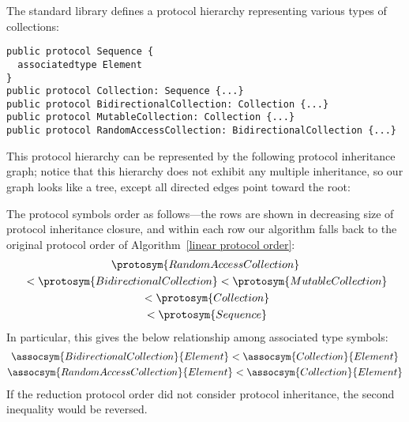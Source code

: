 \documentclass[../generics]{subfiles}
\begin{document}
\begin{example}
The standard library defines a protocol hierarchy representing various types of collections:
\begin{Verbatim}
public protocol Sequence {
  associatedtype Element
}
public protocol Collection: Sequence {...}
public protocol BidirectionalCollection: Collection {...}
public protocol MutableCollection: Collection {...}
public protocol RandomAccessCollection: BidirectionalCollection {...}
\end{Verbatim}
This protocol hierarchy can be represented by the following protocol inheritance graph; notice that this hierarchy does not exhibit any multiple inheritance, so our graph looks like a tree, except all directed edges point toward the root:
\begin{quote}
\end{quote}
The protocol symbols order as follows---the rows are shown in decreasing size of protocol inheritance closure, and within each row our algorithm falls back to the original protocol order of Algorithm~\ref{linear protocol order}:
\begin{gather*}
\protosym{RandomAccessCollection}\\
{} < \protosym{BidirectionalCollection}<\protosym{MutableCollection}\\
{} < \protosym{Collection}\\
{} < \protosym{Sequence}
\end{gather*}
In particular, this gives the below relationship among associated type symbols:
\begin{gather*}
\assocsym{BidirectionalCollection}{Element} < \assocsym{Collection}{Element}\\
\assocsym{RandomAccessCollection}{Element} < \assocsym{Collection}{Element}
\end{gather*}
If the reduction protocol order did not consider protocol inheritance, the second inequality would be reversed.
\end{example}
\end{document}
